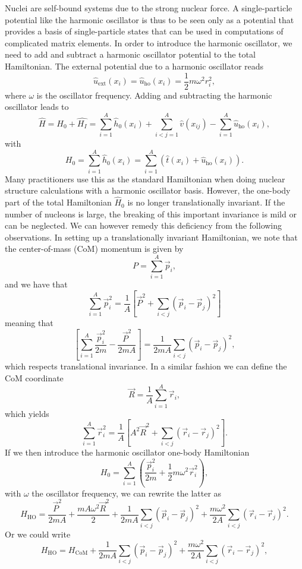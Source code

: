 Nuclei are self-bound systems due to the strong nuclear force. A single-particle potential like the harmonic
oscillator is thus to be seen only as a potential that provides a basis of single-particle states that can be used
in computations of complicated matrix elements. In order to introduce the harmonic oscillator, we need 
to add and subtract a harmonic oscillator
potential to the total Hamiltonian. The external potential due to a harmonic oscillator reads
\[
\hat{u}_{\mathrm{ext}}(x_i)=\hat{u}_{\mathrm{ho}}(x_i)=
\frac{1}{2}m\omega^2 r_i^2,
\]
where $\omega$ is the oscillator frequency. Adding and subtracting the harmonic oscillator leads to 
\[
    \hat{H} = \hat{H_0} + \hat{H_I} = \sum_{i=1}^A \hat{h}_0(x_i) +
    \sum_{i<j=1}^A
    \hat{v}(x_{ij})-\sum_{i=1}^A\hat{u}_{\mathrm{ho}}(x_i),
\]
with
\[
  H_0=\sum_{i=1}^A \hat{h}_0(x_i) = \sum_{i=1}^A\left(\hat{t}(x_i) +
  \hat{u}_{\mathrm{ho}}(x_i)\right).
\]
Many practitioners use this as the standard Hamiltonian when doing
nuclear structure calculations with a harmonic oscillator basis.  
However, the one-body part of the total Hamiltonian $\hat{H}_0$ is no longer translationally invariant.
If the number of nucleons
is large, the breaking of this important invariance is mild or can be neglected. We can however remedy this deficiency from the following observations.
 In setting up a translationally invariant Hamiltonian, we note that the center-of-mass (CoM) momentum is given by
 \[
    P=\sum_{i=1}^A\vec{p}_i,
 \]
 and we have that
 \[
 \sum_{i=1}^A\vec{p}_i^2 =
 \frac{1}{A}\left[\vec{P}^2+\sum_{i<j}(\vec{p}_i-\vec{p}_j)^2\right]
 \]
 meaning that
 \[
 \left[\sum_{i=1}^A\frac{\vec{p}_i^2}{2m}
   -\frac{\vec{P}^2}{2mA}\right]
 =\frac{1}{2mA}\sum_{i<j}(\vec{p}_i-\vec{p}_j)^2,
 \]
which respects translational invariance.
 In a similar fashion we can define the CoM coordinate
 \[
     \vec{R}=\frac{1}{A}\sum_{i=1}^{A}\vec{r}_i,
 \]
 which yields
 \[
 \sum_{i=1}^A\vec{r}_i^2 =
 \frac{1}{A}\left[A^2\vec{R}^2+\sum_{i<j}(\vec{r}_i-\vec{r}_j)^2\right].
 \]
 If we then introduce the harmonic oscillator one-body Hamiltonian
 \[
      H_0= \sum_{i=1}^A\left(\frac{\vec{p}_i^2}{2m}+
      \frac{1}{2}m\omega^2\vec{r}_i^2\right),
 \]
 with $\omega$ the oscillator frequency, we can rewrite the latter as
 \[
      H_{\mathrm{HO}}=
      \frac{\vec{P}^2}{2mA}+\frac{mA\omega^2\vec{R}^2}{2}
      +\frac{1}{2mA}\sum_{i<j}(\vec{p}_i-\vec{p}_j)^2
      +\frac{m\omega^2}{2A}\sum_{i<j}(\vec{r}_i-\vec{r}_j)^2.
     \label{eq:obho}
 \]
 Or we could write
 \[
 H_{\mathrm{HO}}=
 H_{\mathrm{CoM}}+\frac{1}{2mA}\sum_{i<j}(\vec{p}_i-\vec{p}_j)^2
 +\frac{m\omega^2}{2A}\sum_{i<j}(\vec{r}_i-\vec{r}_j)^2,
 \]
